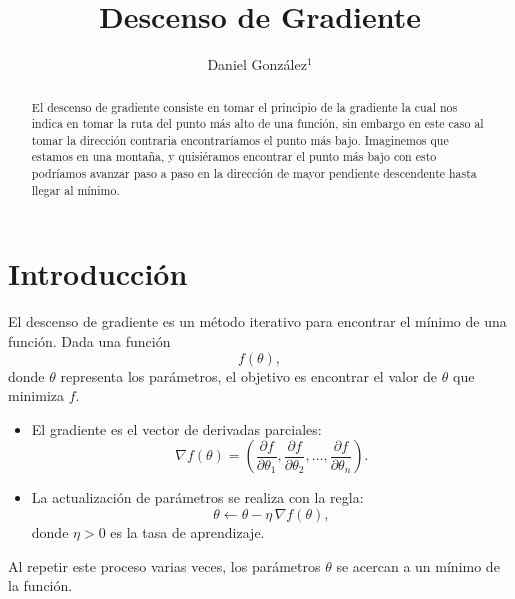 \documentclass{iopjournal}
\begin{document}

\title{Descenso de Gradiente}

\author{Daniel González$^1$}




\begin{abstract}
El descenso de gradiente consiste en tomar el principio de la gradiente la cual nos indica en tomar la ruta del punto más alto de una función, sin embargo en este caso al tomar la dirección contraria encontraríamos el punto más bajo. Imaginemos que estamos en una montaña, y quisiéramos encontrar el punto más bajo con esto podríamos avanzar paso a paso en la dirección de mayor pendiente descendente hasta llegar al mínimo.
\end{abstract}

\section{Introducción}

El descenso de gradiente es un método iterativo para encontrar el mínimo de una función.  
Dada una función
\[
f(\theta),
\]
donde $\theta$ representa los parámetros, el objetivo es encontrar el valor de $\theta$ que minimiza $f$.

\begin{itemize}
    \item El gradiente es el vector de derivadas parciales:
    \begin{equation}
    \nabla f(\theta) = \left( \frac{\partial f}{\partial \theta_1}, \frac{\partial f}{\partial \theta_2}, \dots, \frac{\partial f}{\partial \theta_n} \right).
    \label{d_parcial}
    \end{equation}


    \item La actualización de parámetros se realiza con la regla:
    \[
    \theta \leftarrow \theta - \eta \, \nabla f(\theta),
    \]
    donde $\eta > 0$ es la tasa de aprendizaje.
\end{itemize}

Al repetir este proceso varias veces, los parámetros $\theta$ se acercan a un mínimo de la función.
\end{document}

